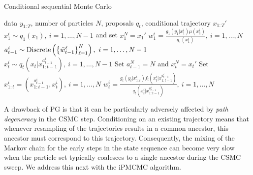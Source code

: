 \begin{algorithm}[tb]
	\caption{Conditional sequential Monte Carlo}
	\label{alg:csmc}
	\begin{spacing}{1.2}
		\begin{algorithmic}[1]
			\renewcommand{\algorithmicrequire}{\textbf{Inputs:}}
			\renewcommand{\algorithmicensure}{\textbf{Outputs:}}				 
			\Require data $y_{1:T}$, number of particles $N$, proposals $q_t$, conditional trajectory $x_{1:T}'$
			\State $x_1^i \sim q_1(x_1), ~i=1,\ldots,N-1$ and set $x_1^N = x_1'$
			\State $w_1^i = \frac{g_1(y_1|x_1^i) \mu(x_1^i)}{q_1(x_1^i)}, ~i=1,\ldots,N$
			\State $a_{t-1}^i \sim \operatorname*{Discrete}\left(\left\{\bar w_{t-1}^\ell\right\}_{\ell=1}^N\right), ~i=1,\ldots,N-1$
			\State $x_t^i \sim q_t(x_t | x_{1:t-1}^{a_{t-1}^i}), ~i=1,\ldots,N-1$
			\State Set $a_{t-1}^N = N$ and $x_t^N = x_t'$
			\State Set $x_{1:t}^i = (x_{1:t-1}^{a_{t-1}^i},x_t^i), ~i=1,\ldots,N$
			\State $w_t^i = \frac{g_t(y_t|x_{1:t}^i) f_t(x_t^i | x_{1:t-1}^{a_{t-1}^i})}{q_t(x_t^i|x_{1:t-1}^{a_{t-1}^i})}, ~i=1,\ldots,N$
			\EndFor
		\end{algorithmic}
	\end{spacing}
\end{algorithm}

A drawback of PG is that it can be particularly adversely affected by \emph{path degeneracy} in the CSMC step.  Conditioning on an existing trajectory means that whenever resampling of the trajectories results in a common ancestor, this ancestor must correspond to this trajectory.  Consequently, the mixing of the Markov chain for the early steps in the state sequence can become very slow when the particle set typically coalesces to a single ancestor during the CSMC sweep.
We address this next with the iPMCMC algorithm.



